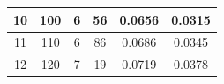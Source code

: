 \documentclass{article}
\begin{document}
\begin{table}[h!]
\begin{tabular}{cccccc}
10     & 100                                                          & 6                                                                              & 56                                                                           & 0.0656                                            & 0.0315                                              \\ \hline
11     & 110                                                          & 6                                                                              & 86                                                                           & 0.0686                                            & 0.0345                                              \\ \hline
12     & 120                                                          & 7                                                                              & 19                                                                           & 0.0719                                            & 0.0378                                              \\ \hline
\end{tabular}
\label{Tab:He-Ne}
\end{table}
\end{document}
